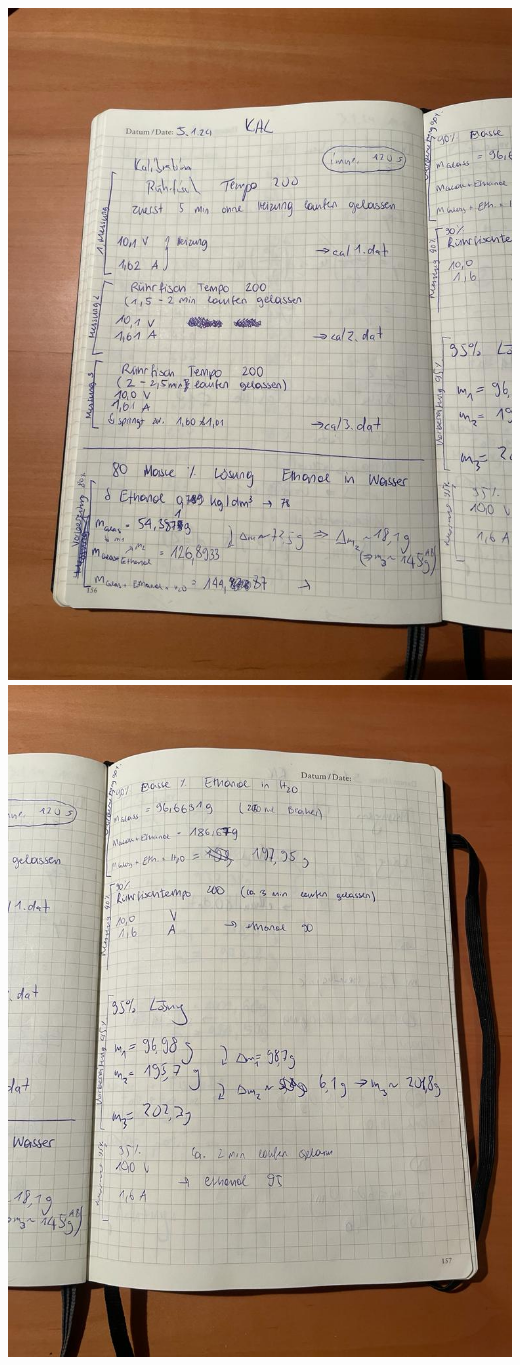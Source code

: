 \includegraphics[scale = 0.2]{figures/photo_1.jpg} 
\includegraphics[scale = 0.2]{figures/photo_2.jpg} 
